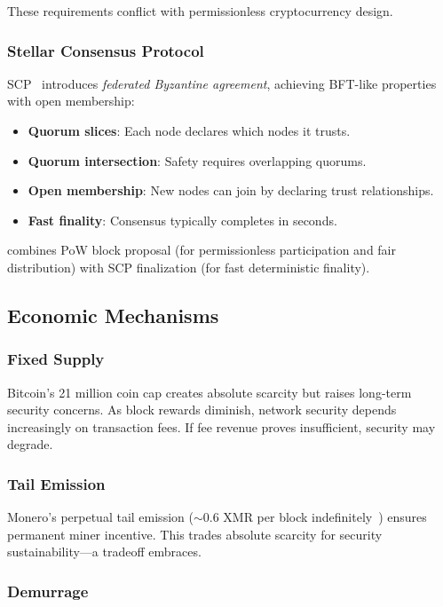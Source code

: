 These requirements conflict with permissionless cryptocurrency design.

\subsubsection{Stellar Consensus Protocol}

SCP~\cite{scp} introduces \textit{federated Byzantine agreement}, achieving
BFT-like properties with open membership:
\begin{itemize}
  \item \textbf{Quorum slices}: Each node declares which nodes it trusts.
  \item \textbf{Quorum intersection}: Safety requires overlapping quorums.
  \item \textbf{Open membership}: New nodes can join by declaring trust
    relationships.
  \item \textbf{Fast finality}: Consensus typically completes in seconds.
\end{itemize}

\Botho combines PoW block proposal (for permissionless participation and
fair distribution) with SCP finalization (for fast deterministic finality).

\subsection{Economic Mechanisms}

\subsubsection{Fixed Supply}

Bitcoin's 21 million coin cap creates absolute scarcity but raises
long-term security concerns. As block rewards diminish, network security
depends increasingly on transaction fees. If fee revenue proves
insufficient, security may degrade.

\subsubsection{Tail Emission}

Monero's perpetual tail emission ($\sim$0.6 XMR per block
indefinitely~\cite{monero}) ensures permanent miner incentive. This trades
absolute scarcity for security sustainability---a tradeoff \Botho embraces.

\subsubsection{Demurrage}


